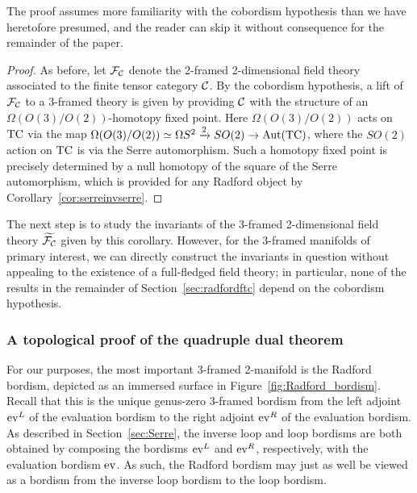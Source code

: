 \documentclass{amsart}
\begin{document}
\nid The proof assumes more familiarity with the cobordism hypothesis than we have heretofore presumed, and the reader can skip it without consequence for the remainder of the paper.

\begin{proof}
As before, let $\mathcal F_\mathcal C$ denote the 2-framed 2-dimensional field theory associated to the finite tensor category $\mathcal C$.  By the cobordism hypothesis, a lift of $\mathcal F_\mathcal C$ to a 3-framed theory is given by providing $\mathcal C$ with the structure of an $\Omega(O(3)/O(2))$-homotopy fixed point.  Here $\Omega(O(3)/O(2))$ acts on $\mathrm{TC}$ via the map $\Omega(O(3)/O(2)) \simeq \Omega S^2 \xrightarrow{2} SO(2) \rightarrow \mathrm{Aut}(\mathrm{TC})$, where the $SO(2)$ action on $\mathrm{TC}$ is via the Serre automorphism.  Such a homotopy fixed point is precisely determined by a null homotopy of the square of the Serre automorphism, which is provided for any Radford object by Corollary~\ref{cor:serreinvserre}.
\end{proof}


The next step is to study the invariants of the 3-framed 2-dimensional field theory $\widetilde{\mathcal F_\mathcal C}$ given by this corollary.  However, for the 3-framed manifolds of primary interest, we can directly construct the invariants in question without appealing to the existence of a full-fledged field theory; in particular, none of the results in the remainder of Section~\ref{sec:radfordftc} depend on the cobordism hypothesis.

\subsubsection{A topological proof of the quadruple dual theorem} \label{sec:topquaddual}

For our purposes, the most important 3-framed 2-manifold is the Radford bordism, depicted as an immersed surface in Figure~\ref{fig:Radford_bordism}.  Recall that this is the unique genus-zero 3-framed bordism from the left adjoint $\mathrm{ev}^L$ of the evaluation bordism to the right adjoint $\mathrm{ev}^R$ of the evaluation bordism.  As described in Section~\ref{sec:Serre}, the inverse loop and loop bordisms are both obtained by composing the bordisms $\mathrm{ev}^L$ and $\mathrm{ev}^R$, respectively, with the evaluation bordism $\mathrm{ev}$.  As such, the Radford bordism may just as well be viewed as a bordism from the inverse loop bordism to the loop bordism.  
\end{document}
